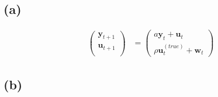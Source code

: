 \documentclass[fleqn, letterpaper]{tufte-handout}
\begin{document}
\subsection{(a)}
\begin{align*}
\begin{pmatrix}
\mathbf{y}_{t+1} \\
\mathbf{u}_{t+1} \\
\end{pmatrix}
&=
\begin{pmatrix}
a\mathbf{y}_t + \mathbf{u}_t \\
\rho\mathbf{u}^{(true)}_t+ \mathbf{w}_t
\end{pmatrix}
\end{align*}

\subsection{(b)}
\end{document}
